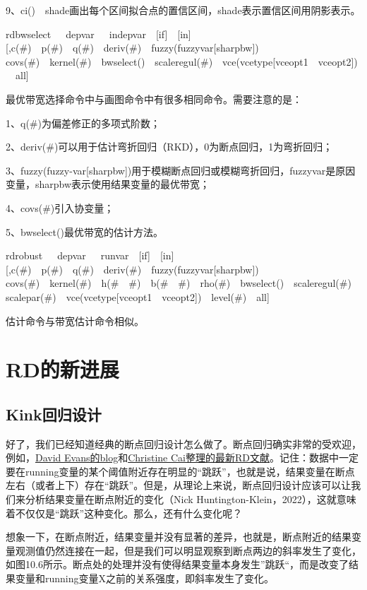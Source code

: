 \documentclass[cn,12pt,math=newtx,citestyle=gb7714-2015,bibstyle=gb7714-2015]{elegantbook}
\begin{document}
	9、ci()~~shade画出每个区间拟合点的置信区间，shade表示置信区间用阴影表示。
	
	rdbwselect~~~depvar~~~indepvar~~[if]~~[in][,c(\#)~~p(\#)~~q(\#)~~deriv(\#)~~fuzzy(fuzzyvar[sharpbw])~~\\
	covs(\#)~~kernel(\#)~~bwselect()~~scaleregul(\#)~~vce(vcetype[vceopt1~~vceopt2])~~all]
	
	最优带宽选择命令中与画图命令中有很多相同命令。需要注意的是：
	
	1、q(\#)为偏差修正的多项式阶数；
	
	2、deriv(\#)可以用于估计弯折回归（RKD），0为断点回归，1为弯折回归；
	
	3、fuzzy(fuzzy-var[sharpbw])用于模糊断点回归或模糊弯折回归，fuzzyvar是原因变量，sharpbw表示使用结果变量的最优带宽；
	
	4、covs(\#)引入协变量；
	
	5、bwselect()最优带宽的估计方法。
	
	rdrobust~~~depvar~~~runvar~~[if]~~[in][,c(\#)~~p(\#)~~q(\#)~~deriv(\#)~~fuzzy(fuzzyvar[sharpbw])~~\\
	covs(\#)~~kernel(\#)~~h(\#~~\#)~~b(\#~~\#)~~rho(\#)~~bwselect()~~scaleregul(\#)~~\\
	scalepar(\#)~~vce(vcetype[vceopt1~~vceopt2])~~level(\#)~~all]
	
	估计命令与带宽估计命令相似。
	
	\section{RD的新进展}
	\subsection{Kink回归设计}
	好了，我们已经知道经典的断点回归设计怎么做了。断点回归确实非常的受欢迎，例如，\href{https://blogs.worldbank.org/impactevaluations/regression-discontinuity-porn}{David Evans的blog}和\href{https://christinecai.github.io/PublicGoods/applied_micro_methods.pdf}{Christine Cai整理的最新RD文献}。记住：数据中一定要在running变量的某个阈值附近存在明显的“跳跃”，也就是说，结果变量在断点左右（或者上下）存在“跳跃”。但是，从理论上来说，断点回归设计应该可以让我们来分析结果变量在断点附近的变化（Nick Huntington-Klein，2022），这就意味着不仅仅是“跳跃”这种变化。那么，还有什么变化呢？
	
	想象一下，在断点附近，结果变量并没有显著的差异，也就是，断点附近的结果变量观测值仍然连接在一起，但是我们可以明显观察到断点两边的斜率发生了变化，如图10.6所示。断点处的处理并没有使得结果变量本身发生”跳跃“，而是改变了结果变量和running变量X之前的关系强度，即斜率发生了变化。
	
\end{document}
